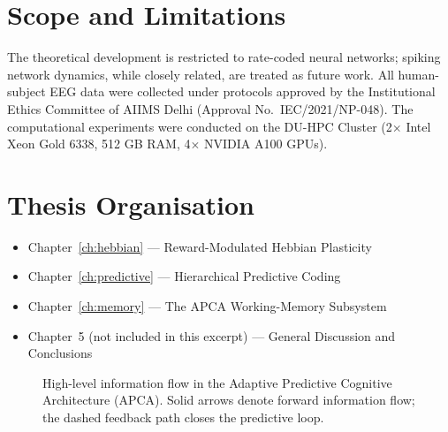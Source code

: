 \documentclass[12pt, a4paper, oneside]{report}
\theoremstyle{definition}
\theoremstyle{remark}
\begin{document}
\section{Scope and Limitations}

The theoretical development is restricted to rate-coded neural networks; spiking network
dynamics, while closely related, are treated as future work.  All human-subject EEG data
were collected under protocols approved by the Institutional Ethics Committee of AIIMS
Delhi (Approval No.\ IEC/2021/NP-048).  The computational experiments were conducted on
the DU-HPC Cluster (2$\times$ Intel Xeon Gold 6338, 512 GB RAM, 4$\times$ NVIDIA A100 GPUs).

\section{Thesis Organisation}

\begin{itemize}
  \item Chapter~\ref{ch:hebbian} --- Reward-Modulated Hebbian Plasticity
  \item Chapter~\ref{ch:predictive} --- Hierarchical Predictive Coding
  \item Chapter~\ref{ch:memory} --- The APCA Working-Memory Subsystem
  \item Chapter~5 (not included in this excerpt) --- General Discussion and Conclusions
\end{itemize}

\begin{figure}[H]
\centering
{}
\caption{High-level information flow in the Adaptive Predictive Cognitive Architecture
  (APCA).  Solid arrows denote forward information flow; the dashed feedback path closes
  the predictive loop.}
\label{fig:apca-overview}
\end{figure}
\end{document}
